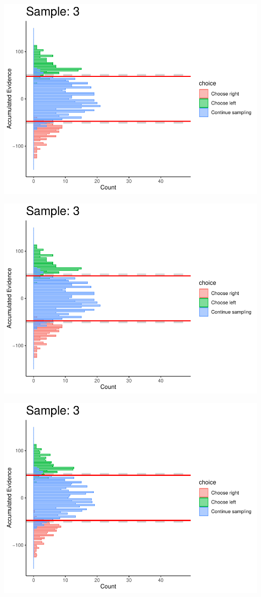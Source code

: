 \documentclass[
]{book}
\begin{document}
\begin{center}\includegraphics[width=0.8\linewidth]{LateNightBayes_files/figure-latex/fixed_dcb-25} \end{center}

\begin{center}\includegraphics[width=0.8\linewidth]{LateNightBayes_files/figure-latex/fixed_dcb-26} \end{center}

\begin{center}\includegraphics[width=0.8\linewidth]{LateNightBayes_files/figure-latex/fixed_dcb-27} \end{center}
\end{document}
